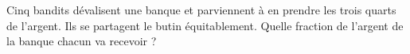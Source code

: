 
\begin{exercice}\label{exosmath-0883}

    Cinq bandits dévalisent une banque et parviennent à en prendre les trois quarts de l'argent. Ils se partagent le butin équitablement. Quelle fraction de l'argent de la banque chacun va recevoir ?

\end{exercice}
